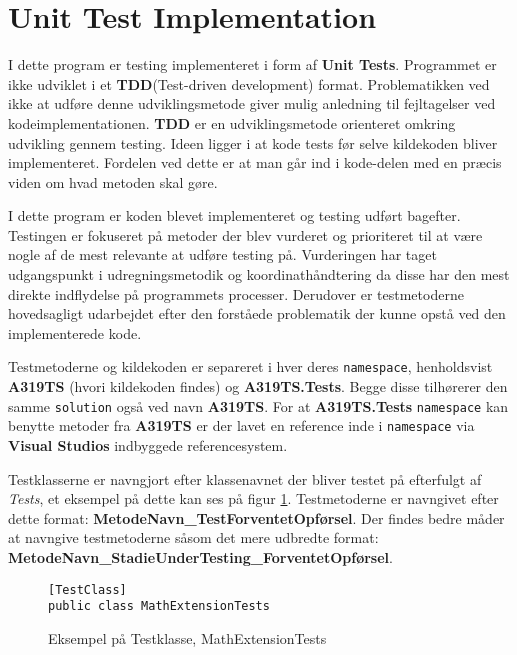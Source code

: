 \section{Unit Test Implementation}\label{unittest}

I dette program er testing implementeret i form af \textbf{Unit Tests}. Programmet er ikke udviklet i et \textbf{TDD}(Test-driven development) format. Problematikken ved ikke at udføre denne udviklingsmetode giver mulig anledning til fejltagelser ved kodeimplementationen. \textbf{TDD} er en udviklingsmetode orienteret omkring udvikling gennem testing. Ideen ligger i at kode tests før selve kildekoden bliver implementeret. Fordelen ved dette er at man går ind i kode-delen med en præcis viden om hvad metoden skal gøre.\cite{unittestbenefits}

\vspace{5mm}

I dette program er koden blevet implementeret og testing udført bagefter. Testingen er fokuseret på metoder der blev vurderet og prioriteret til at være nogle af de mest relevante at udføre testing på. Vurderingen har taget udgangspunkt i udregningsmetodik og koordinathåndtering da disse har den mest direkte indflydelse på programmets processer. Derudover er testmetoderne hovedsagligt udarbejdet efter den forståede problematik der kunne opstå ved den implementerede kode.

\vspace{5mm}

Testmetoderne og kildekoden er separeret i hver deres \texttt{namespace}, henholdsvist \textbf{A319TS} (hvori kildekoden findes) og \textbf{A319TS.Tests}. Begge disse tilhørerer den samme \texttt{solution} også ved navn \textbf{A319TS}. For at \textbf{A319TS.Tests} \texttt{namespace} kan benytte metoder fra \textbf{A319TS} er der lavet en reference inde i \texttt{namespace} via \textbf{Visual Studios} indbyggede referencesystem.

Testklasserne er navngjort efter klassenavnet der bliver testet på efterfulgt af \textit{Tests}, et eksempel på dette kan ses på figur \ref{TestMethod}. Testmetoderne er navngivet efter dette format: \textbf{MetodeNavn\_TestForventetOpførsel}. Der findes bedre måder at navngive testmetoderne såsom det mere udbredte format: \textbf{MetodeNavn\_StadieUnderTesting\_ForventetOpførsel}.\cite{unittestnamingpractices}

\begin{figure}[H]
\begin{lstlisting}
[TestClass]
public class MathExtensionTests
\end{lstlisting}
\caption{Eksempel på Testklasse, MathExtensionTests}\label{TestMethod}
\end{figure}

